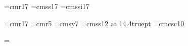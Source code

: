 \font\seventeenrm=cmr17  \font\seventeenss=cmss17  \font\seventeenssi=cmssi17

\def\seventeenpoint{%
	\def\sl{\seventeenssi}\def\it{\seventeenssi}\def\bf{\seventeenss}%
	\def\rm{\seventeenrm}\def\ss{\seventeenss}\def\ssi{\seventeenssi}%
	\baselineskip=19pt%
	\rm%
}
\def\twelvepoint{%
	\def\sl{\twelvesl}\def\it{\twelveit}\def\bf{\twelvebf}%
	\def\rm{\twelverm\let\sl=\twelvesl}\def\ss{\twelvess\let\sl=\ssi}%
	\def\ssi{\twelvessi}\def\tt{\twelvett}%
	\baselineskip=14pt%
	\rm%
}
\def\elevenpoint{%
	\def\sl{\elevensl}\def\it{\elevenit}\def\bf{\elevenbf}%
	\def\rm{\elevenrm\let\sl=\elevensl}\def\ss{\elevenss\let\sl=\ssi}%
	\def\ssi{\elevenssi}%
	\def\tt{\eleventt}%
	\baselineskip=13pt%
	\rm%
}
\def\tenpoint{%
	\def\sl{\tensl}\def\it{\tenit}\def\bf{\tenbf}%
	\def\ssb{\tenssb}%
	\def\rm{\tenrm\let\sl=\tensl}\def\ss{\tenss\let\sl=\ssi}%
	\def\ssi{\tenssi}%
	\def\tt{\tentt}%
	\baselineskip=12pt%
	\rm%
}
\def\ninepoint{%
	\def\sl{\ninesl}\def\it{\nineit}\def\bf{\ninebf}%
	\def\rm{\ninerm\let\sl=\ninesl}\def\ss{\niness\let\sl=\ssi}%
	\def\ssi{\ninessi}%
	\def\tt{\ninett}%
	\baselineskip=11pt%
	\rm%
}
\def\eightpoint{%
	\def\sl{\eightsl}\def\it{\eightit}\def\bf{\eightbf}%
	\def\rm{\eightrm\let\sl=\eightsl}\def\ss{\eightss\let\sl=\ssi}%
	\def\ssi{\eightssi}%
	\def\tt{\eighttt}%
	\baselineskip=10pt%
	\rm%
}

\font\HUGE=cmr17 %
\font\verysmallrm=cmr5			%
\font\smallsy=cmsy7			%
\def\tiny{\eightpoint\ss}		%
\let\em=\eightssi
\font\quotefont=cmss12 at 14.4truept	%
\font\quoteefont=cmcsc10		%


\newdimen\normalhsize			%
\newdimen\normalvsize			%

\normalhsize=\hsize

%
%
%
\def\newspage{%
	\global\topskip=0pt		%
	\global\hoffset=-.25 true in	%
	\global\pretolerance=1000	%
	\global\tolerance=1500		%
	\global\hyphenpenalty=500	%
	\global\emergencystretch=30pt
	\global\normalhsize=7in
	\global\hsize=\normalhsize	%
	\global\vsize=9in		%
	\global\abovedisplayskip=\baselineskip
	\global\belowdisplayskip=\baselineskip
	\global\pagewidth=\hsize
	\global\pageheight=\vsize
}


